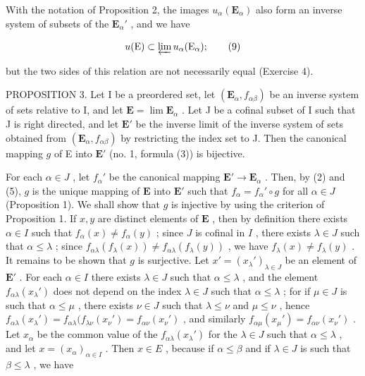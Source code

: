 With the notation of Proposition 2, the images \(u_{\alpha}(\mathbf{E}_{\alpha})\) also form an inverse system of subsets of the \(\mathbf{E}_{\alpha}'\) , and we have

\[
u (\mathrm{E}) \subset \varprojlim u _ {\alpha} (\mathrm{E} _ {\alpha});\tag{9}
\]

but the two sides of this relation are not necessarily equal (Exercise 4).

PROPOSITION 3. Let I be a preordered set, let \((\mathbf{E}_{\alpha}, f_{\alpha \beta})\) be an inverse system of sets relative to I, and let \(\mathbf{E} = \lim \mathbf{E}_{\alpha}\) . Let J be a cofinal subset of I such that J is right directed, and let \(\mathbf{E}'\) be the inverse limit of the inverse system of sets obtained from \((\mathbf{E}_{\alpha}, f_{\alpha \beta})\) by restricting the index set to J. Then the canonical mapping \(g\) of E into \(\mathbf{E}'\) (no. 1, formula (3)) is bijective.

For each \(\alpha \in J\) , let \(f_{\alpha}'\) be the canonical mapping \(\mathbf{E}' \to \mathbf{E}_{\alpha}\) . Then, by (2) and (5), \(g\) is the unique mapping of \(\mathbf{E}\) into \(\mathbf{E}'\) such that \(f_{\alpha} = f_{\alpha}' \circ g\) for all \(\alpha \in J\) (Proposition 1). We shall show that \(g\) is injective by using the criterion of Proposition 1. If \(x, y\) are distinct elements of \(\mathbf{E}\) , then by definition there exists \(\alpha \in I\) such that \(f_{\alpha}(x) \neq f_{\alpha}(y)\) ; since \(J\) is cofinal in \(I\) , there exists \(\lambda \in J\) such that \(\alpha \leqslant \lambda\) ; since \(f_{\alpha\lambda}(f_{\lambda}(x)) \neq f_{\alpha\lambda}(f_{\lambda}(y))\) , we have \(f_{\lambda}(x) \neq f_{\lambda}(y)\) . It remains to be shown that \(g\) is surjective. Let \(x' = (x_{\lambda}')_{\lambda \in J}\) be an element of \(\mathbf{E}'\) . For each \(\alpha \in I\) there exists \(\lambda \in J\) such that \(\alpha \leqslant \lambda\) , and the element \(f_{\alpha\lambda}(x_{\lambda}')\) does not depend on the index \(\lambda \in J\) such that \(\alpha \leqslant \lambda\) ; for if \(\mu \in J\) is such that \(\alpha \leqslant \mu\) , there exists \(\nu \in J\) such that \(\lambda \leqslant \nu\) and \(\mu \leqslant \nu\) , hence \(f_{\alpha\lambda}(x_{\lambda}') = f_{\alpha\lambda}(f_{\lambda\nu}(x_{\nu}') = f_{\alpha\nu}(x_{\nu}')\) , and similarly \(f_{\alpha\mu}(x_{\mu}') = f_{\alpha\nu}(x_{\nu}')\) . Let \(x_{\alpha}\) be the common value of the \(f_{\alpha\lambda}(x_{\lambda}')\) for the \(\lambda \in J\) such that \(\alpha \leqslant \lambda\) , and let \(x = (x_{\alpha})_{\alpha \in I}\) . Then \(x \in E\) , because if \(\alpha \leqslant \beta\) and if \(\lambda \in J\) is such that \(\beta \leqslant \lambda\) , we have


